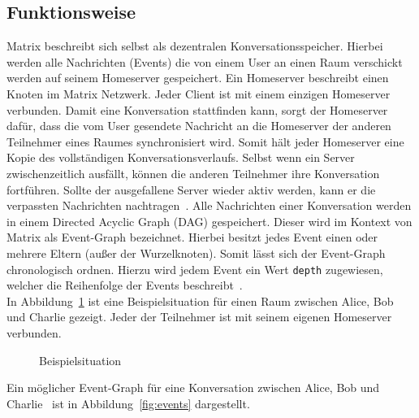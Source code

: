     \subsection{Funktionsweise}\label{subsec:funktionsweise}
    Matrix beschreibt sich selbst als dezentralen Konversationsspeicher\cite{matrix}.
    Hierbei werden alle Nachrichten (Events) die von einem User an einen Raum verschickt werden auf seinem Homeserver gespeichert.
    Ein Homeserver beschreibt einen Knoten im Matrix Netzwerk.
    Jeder Client ist mit einem einzigen Homeserver verbunden.
    Damit eine Konversation stattfinden kann, sorgt der Homeserver dafür, dass die vom User gesendete Nachricht an die Homeserver der anderen Teilnehmer eines Raumes synchronisiert wird.
    Somit hält jeder Homeserver eine Kopie des vollständigen Konversationsverlaufs.
    Selbst wenn ein Server zwischenzeitlich ausfällt, können die anderen Teilnehmer ihre Konversation fortführen.
    Sollte der ausgefallene Server wieder aktiv werden, kann er die verpassten Nachrichten nachtragen~\cite{matrix}.
    Alle Nachrichten einer Konversation werden in einem Directed Acyclic Graph (DAG) gespeichert.
    Dieser wird im Kontext von Matrix als Event-Graph bezeichnet.
    Hierbei besitzt jedes Event einen oder mehrere Eltern (außer der Wurzelknoten).
    Somit lässt sich der Event-Graph chronologisch ordnen.
    Hierzu wird jedem Event ein Wert \texttt{depth} zugewiesen, welcher die Reihenfolge der Events beschreibt~\cite{eventgraph}.\\
    In Abbildung~\ref{fig:matrixfunktionsweise} ist eine Beispielsituation für einen Raum zwischen Alice, Bob und Charlie gezeigt.
    Jeder der Teilnehmer ist mit seinem eigenen Homeserver verbunden.
    \begin{figure}[h]
        \centering
        
        \caption{Beispielsituation}
        \label{fig:matrixfunktionsweise}
    \end{figure}
    \newpage
    Ein möglicher Event-Graph für eine Konversation zwischen Alice, Bob und Charlie~\cite{matrix} ist in Abbildung~\ref{fig:events} dargestellt.
